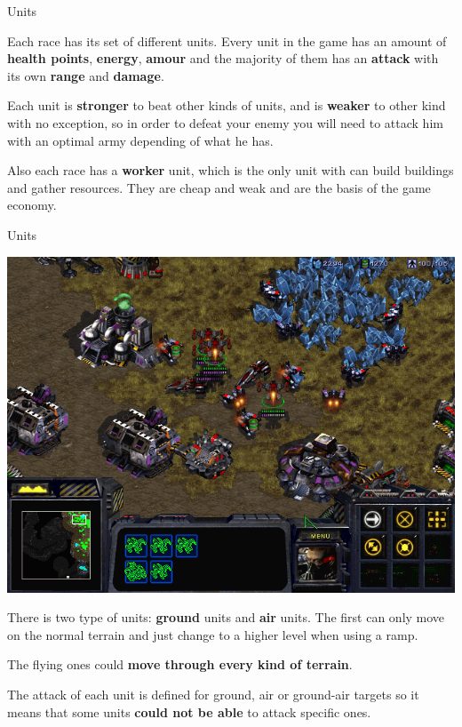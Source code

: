 \documentclass[10pt]{beamer}
\begin{document}
\begin{frame}{Units}

Each race has its set of different units. Every unit in the game has an amount of \textbf{health points}, \textbf{energy}, \textbf{amour} and the majority of them has an \textbf{attack} with its own \textbf{range} and \textbf{damage}. \newline

Each unit is \textbf{stronger} to beat other kinds of units, and is \textbf{weaker} to other kind with no exception, so in order to defeat your enemy you will need to attack him with an optimal army depending of what he has. \newline

Also each race has a \textbf{worker} unit, which is the only unit with can build buildings and gather resources. They are cheap and weak and are the basis of the game economy.
\end{frame}

\begin{frame}{Units}
\begin{center}
	  \includegraphics[scale=0.2]{sori.png}
\end{center}
There is two type of units: \textbf{ground} units and \textbf{air} units. The first can only move on the normal terrain and just change to a higher level when using a ramp. \newline

The flying ones could\textbf{ move through every kind of terrain}. \newline

The attack of each unit is defined for ground, air or ground-air targets so it means that some units \textbf{could not be able} to attack specific ones.
\end{frame}
\end{document}
